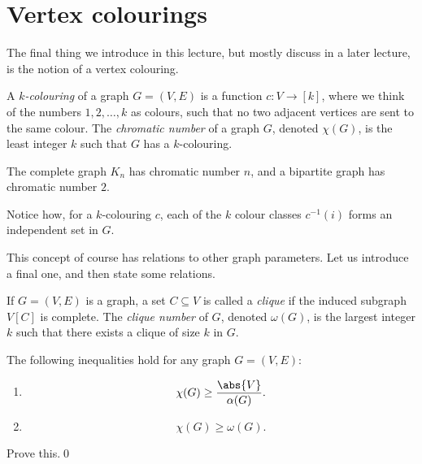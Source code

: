 \documentclass[nobib]{tufte-handout}
\begin{document}
\section{Vertex colourings}

The final thing we introduce in this lecture, but mostly discuss in a later lecture, is the notion of a vertex colouring.

\begin{definition}
    A \emph{$k$-colouring} of a graph $G = (V,E)$ is a function $c: V \to [k]$, where we think of the numbers $1,2,\ldots,k$ as colours, such that no two adjacent vertices are sent to the same colour. The \emph{chromatic number} of a graph $G$, denoted $\chi(G)$, is the least integer $k$ such that $G$ has a $k$-colouring.
\end{definition}

\begin{example}
    The complete graph $K_n$ has chromatic number $n$, and a bipartite graph has chromatic number $2$.
\end{example}

\begin{remark}
    Notice how, for a $k$-colouring $c$, each of the $k$ colour classes $c^{-1}(i)$ forms an independent set in $G$.
\end{remark}

This concept of course has relations to other graph parameters. Let us introduce a final one, and then state some relations.

\begin{definition}
    If $G = (V,E)$ is a graph, a set $C\subseteq V$ is called a \emph{clique} if the induced subgraph $V[C]$ is complete. The \emph{clique number} of $G$, denoted $\omega(G)$, is the largest integer $k$ such that there exists a clique of size $k$ in $G$.
\end{definition}

\begin{proposition}
    The following inequalities hold for any graph $G = (V,E)$:
    \begin{enumerate}
        \item $$\chi(G) \geq \frac{\abs{V}}{\alpha(G)}.$$
        \item $$\chi(G) \geq \omega(G).$$
    \end{enumerate}

    \begin{xca}
        Prove this.\qed
    \end{xca}
\end{proposition}
\end{document}
